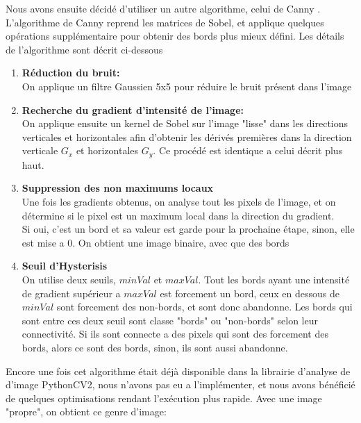 \documentclass[a4paper, 12pt, titlepage, oneside, french]{article}
\begin{document}
	Nous avons ensuite décidé d'utiliser un autre algorithme, celui de Canny \cite{CannyOp}. L'algorithme de Canny reprend les matrices de Sobel, et applique quelques opérations supplémentaire pour obtenir des bords plus mieux défini. Les détails de l'algorithme sont décrit ci-dessous
	\begin{enumerate}
		\item \textbf{Réduction du bruit:}\\
			\indent On applique un filtre Gaussien 5x5 pour réduire le bruit présent dans l'image
		\item \textbf{Recherche du gradient d'intensité de l'image:}\\  
			\indent On applique ensuite un kernel de Sobel sur l'image "lisse" dans les directions verticales et horizontales afin d'obtenir les dérivés premières dans
			la direction verticale $G_x$ et horizontales $G_y$. Ce procédé est identique a celui décrit plus haut.

		\item \textbf{Suppression des non maximums locaux}\\
			\indent Une fois les gradients obtenus, on analyse tout les pixels de l'image, et on détermine si le pixel est un maximum local dans la
			direction du gradient. \\
			Si oui, c'est un bord et sa valeur est garde pour la prochaine étape, sinon, elle est mise a 0. On obtient une image binaire, avec que des bords

		\item \textbf{Seuil d'Hysterisis} \\
			\indent On utilise deux seuils, $minVal$ et $maxVal$. Tout les bords ayant une intensité de gradient supérieur a $maxVal$ est forcement un
			bord, ceux en dessous de $minVal$ sont forcement des non-bords, et sont donc abandonne. Les bords qui sont entre ces deux seuil sont classe
			"bords" ou "non-bords" selon leur connectivité. Si ils sont connecte a des pixels qui sont des forcement des bords, alors ce sont des bords,
			sinon, ils sont aussi abandonne.\\

	\end{enumerate}
	Encore une fois cet algorithme était déjà disponible dans la librairie d'analyse de d'image PythonCV2, nous n'avons pas eu a l'implémenter, et nous avons bénéficié de quelques optimisations rendant l'exécution plus rapide.
	Avec une image "propre", on obtient ce genre d'image:
	\newpage
\end{document}
